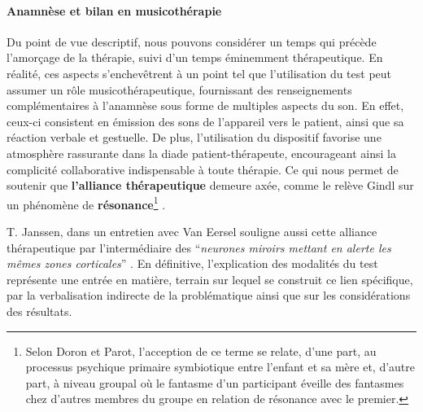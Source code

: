 \paragraph{\textbf{Anamnèse et bilan en musicothérapie}}
Du point de vue descriptif, nous pouvons considérer un temps qui
précède
l'amorçage de la thérapie, suivi d'un temps éminemment thérapeutique.
En réalité, ces aspects s'enchevêtrent à un point tel que
l'utilisation du test peut assumer un rôle musicothérapeutique, fournissant des
  renseignements complémentaires à l'anamnèse sous forme de multiples
  aspects du son. En effet, ceux-ci consistent en émission des sons de
  l'appareil vers le patient, ainsi que sa réaction verbale et gestuelle.
De plus, l'utilisation
   du dispositif favorise une atmosphère rassurante dans la diade
   patient-thérapeute, encourageant ainsi la complicité collaborative
 indispensable à toute
 thérapie.
Ce qui nous permet de soutenir que
 \textbf{l'alliance thérapeutique} demeure axée, comme le relève Gindl
  \autocite{gindl} sur
 un phénomène de \textbf{résonance}\footnote{Selon Doron et Parot, l'acception de ce terme se relate, d'une part, au processus psychique
primaire symbiotique entre l'enfant et sa mère et, d'autre part, à
niveau groupal où le fantasme d'un participant éveille des fantasmes chez d'autres membres du groupe en relation
de résonance  avec le premier.} \autocite{doronparot}.



T. Janssen, dans un entretien
avec Van Eersel
souligne aussi cette alliance thérapeutique
par l'intermédiaire des ``\textit{neurones
 miroirs mettant en alerte les mêmes zones corticales}'' \autocite[203]{van_eersel_cerveau}.
En définitive, l'explication des modalités du test représente une
  entrée en matière, terrain  sur lequel se construit ce lien spécifique,
  par la verbalisation indirecte de la problématique ainsi que sur
  les considérations des résultats.

